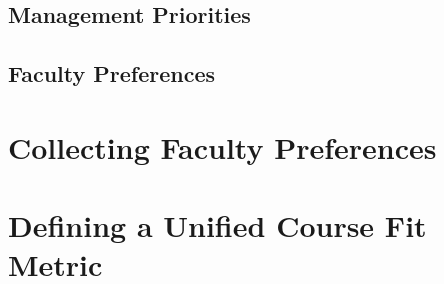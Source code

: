 




\subsection{Management Priorities}

\subsection{Faculty Preferences}

\section{Collecting Faculty Preferences}


\section{Defining a Unified Course Fit Metric}
